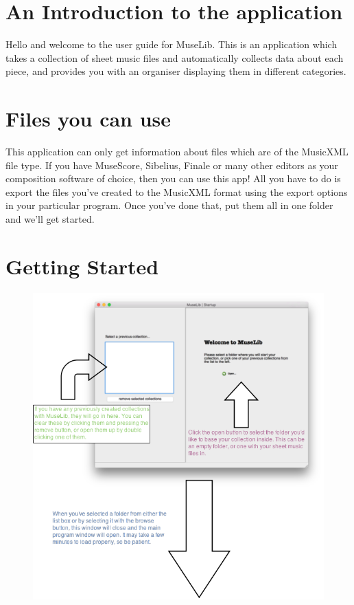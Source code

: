 \section{An Introduction to the application}
Hello and welcome to the user guide for MuseLib. This is an application which takes a collection of sheet music files and automatically collects data about each piece, and provides you with an organiser displaying them in different categories.
\section{Files you can use}
This application can only get information about files which are of the MusicXML file type. If you have MuseScore, Sibelius, Finale or many other editors as your composition software of choice, then you can use this app! All you have to do is export the files you've created to the MusicXML format using the export options in your particular program. Once you've done that, put them all in one folder and we'll get started.

\section{Getting Started}
\begin{figure}[H]
\centering
\includegraphics[width=\textwidth]{startup}	
\end{figure}

